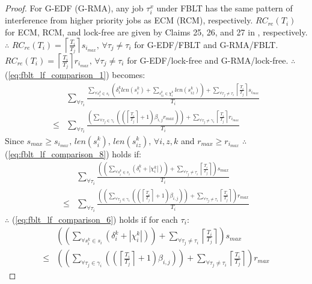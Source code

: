\documentclass[a4paper,english]{article}
\newtheorem{proof}{Proof}
\begin{document}
\begin{proof}
For G-EDF (G-RMA),
any job $\tau_{i}^{x}$ under FBLT has the same pattern of interference
from higher priority jobs as ECM (RCM), respectively. $RC_{re}(T_{i})$
for ECM, RCM, and lock-free are given by Claims 25, 26, and 27 in \cite{shambake_phd_proposal}, 
respectively. $\therefore$ $RC_{re}(T_{i})=\left\lceil \frac{T_{i}}{T_{j}}\right\rceil s_{i_{max}},\,\forall\tau_{j}\neq\tau_{i}$ for G-EDF/FBLT and G-RMA/FBLT. $RC_{re}(T_{i})=\left\lceil \frac{T_{i}}{T_{j}}\right\rceil r_{i_{max}},\,\forall\tau_{j}\neq\tau_{i}$ for G-EDF/lock-free and G-RMA/lock-free. 
$\therefore$ (\ref{eq:fblt_lf_comparison_1}) becomes:
\begin{eqnarray}
 & \sum_{\forall\tau_{i}}\frac{\sum_{\forall s_{i}^{k}\in s_{i}}\left(\delta_{i}^{k}len(s_{i}^{k})+\sum_{s_{iz}^{k}\in\chi_{i}^{k}}len(s_{iz}^{k})\right)+\sum_{\forall\tau_{j}\neq\tau_{i}}\left\lceil \frac{T_{i}}{T_{j}}\right\rceil s_{i_{max}}}{T_{i}}\label{eq:fblt_lf_comparison_8}\\
\le & \sum_{\forall\tau_{i}}\frac{\left(\sum_{\forall\tau_{j}\in\gamma_{i}}\left(\left(\left\lceil \frac{T_{i}}{T_{j}}\right\rceil +1\right)\beta_{i,j}r_{max}\right)\right)+\sum_{\forall\tau_{j}\neq\gamma_{i}}\left\lceil \frac{T_{i}}{T_{j}}\right\rceil r_{i_{max}}}{T_{i}}\nonumber 
\end{eqnarray}
Since $s_{max}\ge s_{i_{max}},\, len(s_{i}^{k}),\, len(s_{iz}^{k}),\,\forall i,z,k$
and $r_{max}\ge r_{i_{max}}$ $\therefore$ (\ref{eq:fblt_lf_comparison_8})
holds if: 
\begin{eqnarray}
 & \sum_{\forall\tau_{i}}\frac{\left(\left(\sum_{\forall s_{i}^{k}\in s_{i}}\left(\delta_{i}^{k}+|\chi_{i}^{k}|\right)\right)+\sum_{\forall\tau_{j}\neq\tau_{i}}\left\lceil \frac{T_{i}}{T_{j}}\right\rceil \right)s_{max}}{T_{i}}\label{eq:fblt_lf_comparison_6}\\
\le & \sum_{\forall\tau_{i}}\frac{\left(\left(\sum_{\forall\tau_{j}\in\gamma_{i}}\left(\left(\left\lceil \frac{T_{i}}{T_{j}}\right\rceil +1\right)\beta_{i,j}\right)\right)+\sum_{\forall\tau_{j}\neq\tau_{i}}\left\lceil \frac{T_{i}}{T_{j}}\right\rceil \right)r_{max}}{T_{i}}\nonumber 
\end{eqnarray}
$\therefore$ (\ref{eq:fblt_lf_comparison_6}) holds if for each $\tau_{i}$:
\begin{eqnarray}
 & \left(\left(\sum_{\forall s_{i}^{k}\in s_{i}}\left(\delta_{i}^{k}+|\chi_{i}^{k}|\right)\right)+\sum_{\forall\tau_{j}\neq\tau_{i}}\left\lceil \frac{T_{i}}{T_{j}}\right\rceil \right)s_{max}\label{eq:fblt_lf_comparison_7}\\
\le & \left(\left(\sum_{\forall\tau_{j}\in\gamma_{i}}\left(\left(\left\lceil \frac{T_{i}}{T_{j}}\right\rceil +1\right)\beta_{i,j}\right)\right)+\sum_{\forall\tau_{j}\neq\tau_{i}}\left\lceil \frac{T_{i}}{T_{j}}\right\rceil \right)r_{max}\nonumber 

\end{eqnarray}
\end{proof}
\end{document}
